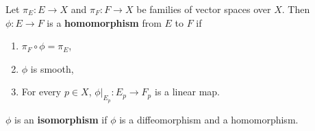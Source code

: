 Let $\pi_E: E \rightarrow X$ and $\pi_F: F \rightarrow X$ be families of vector spaces over $X$. Then $\phi: E \rightarrow F$ is a \textbf{homomorphism} from $E$ to $F$ if

\begin{enumerate}
\item[(a)] $\pi_F \circ \phi = \pi_E$,
\item[(b)] $\phi$ is smooth,
\item[(c)] For every $p \in X$, $\phi|_{E_p}: E_p \rightarrow F_p$ is a linear map.
\end{enumerate}

$\phi$ is an \textbf{isomorphism} if $\phi$ is a diffeomorphism and a homomorphism.

